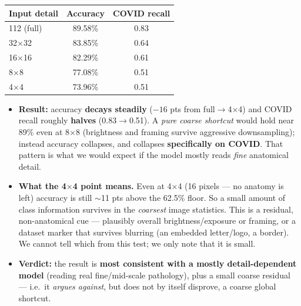 \documentclass[11pt]{article}
\begin{document}
\begin{table}[htbp]
\centering
\begin{tabular}{@{}lcc@{}}
\toprule
\textbf{Input detail} & \textbf{Accuracy} & \textbf{COVID recall} \\
\midrule
112 (full) & 89.58\% & 0.83 \\
32$\times$32 & 83.85\% & 0.64 \\
16$\times$16 & 82.29\% & 0.61 \\
8$\times$8 & 77.08\% & 0.51 \\
4$\times$4 & 73.96\% & 0.51 \\
\bottomrule
\end{tabular}
\end{table}

\begin{itemize}[nosep,leftmargin=1.4em]
  \item \textbf{Result:} accuracy \textbf{decays steadily} ($-16$ pts from
        full$\to$4$\times$4) and COVID recall roughly \textbf{halves}
        (0.83$\to$0.51). A \emph{pure coarse shortcut} would hold near 89\% even at
        8$\times$8 (brightness and framing survive aggressive downsampling); instead
        accuracy collapses, and collapses \textbf{specifically on COVID}. That
        pattern is what we would expect if the model mostly reads \emph{fine}
        anatomical detail.
  \item \textbf{What the 4$\times$4 point means.} Even at 4$\times$4 (16 pixels ---
        no anatomy is left) accuracy is still $\sim$11 pts above the 62.5\% floor.
        So a small amount of class information survives in the \emph{coarsest}
        image statistics. This is a residual, non-anatomical cue --- plausibly
        overall brightness/exposure or framing, or a dataset marker that survives
        blurring (an embedded letter/logo, a border). We cannot tell which from
        this test; we only note that it is small.
  \item \textbf{Verdict:} the result is \textbf{most consistent with a mostly
        detail-dependent model} (reading real fine/mid-scale pathology), plus a
        small coarse residual --- i.e.\ it \emph{argues against}, but does not by
        itself disprove, a coarse global shortcut.
\end{itemize}
\end{document}

